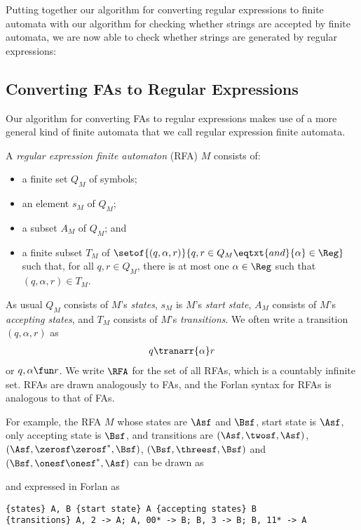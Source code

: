 Putting together our algorithm for converting regular expressions to finite
automata with our algorithm for checking whether strings are accepted by
finite automata, we are now able to check whether strings are
generated by regular expressions:


\subsection{Converting FAs to Regular Expressions}

Our algorithm for converting FAs to regular expressions makes
use of a more general kind of finite automata that we call
regular expression finite automata.

A \emph{regular expression finite automaton} (RFA) $M$ consists of:
\begin{itemize}
\item a finite set $Q_M$ of symbols;

\item an element $s_M$ of $Q_M$;

\item a subset $A_M$ of $Q_M$; and

\item a finite subset $T_M$ of
$\setof{(q,{\alpha},r)}{q,r\in Q_M\eqtxt{and}
{\alpha}\in{\Reg}}$ such that,
for all $q,r\in Q_M$, there is at most one $\alpha\in\Reg$
such that $(q,\alpha,r)\in T_M$.
\end{itemize}
As usual $Q_M$ consists of $M$'s \emph{states}, $s_M$ is $M$'s
\emph{start state}, $A_M$ consists of $M$'s \emph{accepting states},
and $T_M$ consists of $M$'s \emph{transitions}.  We often write
a transition $(q,\alpha,r)$ as
\begin{gather*}
q\tranarr{\alpha}r
\end{gather*}
or $q,\alpha\fun r$.
We write $\RFA$ for the set of all RFAs, which is a countably infinite
set.  RFAs are drawn analogously to FAs, and the Forlan syntax for
RFAs is analogous to that of FAs.

For example, the RFA $M$ whose states are $\Asf$ and $\Bsf$, start
state is $\Asf$, only accepting state is $\Bsf$, and
transitions are $(\Asf,\twosf, \Asf)$, $(\Asf,\zerosf\zerosf^*,\Bsf)$,
$(\Bsf,\threesf,\Bsf)$ and $(\Bsf,\onesf\onesf^*,\Asf)$ can
be drawn as
\begin{center}
  
\end{center}
and expressed in Forlan as
\begin{verbatim}
{states} A, B {start state} A {accepting states} B
{transitions} A, 2 -> A; A, 00* -> B; B, 3 -> B; B, 11* -> A
\end{verbatim}

